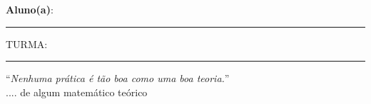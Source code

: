\documentclass[11pt, a4paper,final]{article}
\begin{document}
\begin{large}
\begin{center}

\end{center}
\end{large} 

\textbf{Aluno(a)}: \noindent\rule{0.7\textwidth}{1pt} TURMA: \noindent\rule{0.05\textwidth}{1pt} 

\begin{flushright}
``{\em  Nenhuma prática é tão boa como uma boa teoria.}''\\
.... de algum matemático teórico
\end{flushright}
	
\end{document}
